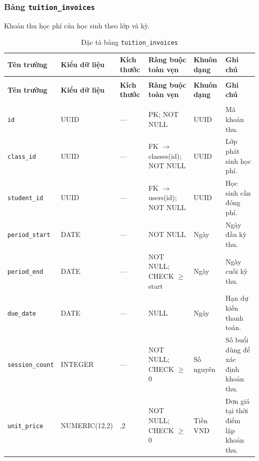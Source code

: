 \subsubsection{Bảng \texttt{tuition\_invoices}}
Khoản thu học phí của học sinh theo lớp và kỳ.

\begingroup
\fontsize{9.2}{11.2}\selectfont
\setlength{\tabcolsep}{2.4pt}
\renewcommand{\arraystretch}{1.22}
\begin{longtable}{|>{\raggedright\arraybackslash}p{2.25cm}|>{\raggedright\arraybackslash}p{2.48cm}|>{\raggedright\arraybackslash}p{0.95cm}|>{\raggedright\arraybackslash}p{3.0cm}|>{\raggedright\arraybackslash}p{1.25cm}|>{\raggedright\arraybackslash}p{4.27cm}|}
\caption{Đặc tả bảng \texttt{tuition\_invoices}}\label{tab:csdl:tuition_invoices}\\
\hline\rowcolor{blue!11}\textbf{Tên trường}&\textbf{Kiểu dữ liệu}&\textbf{Kích thước}&\textbf{Ràng buộc toàn vẹn}&\textbf{Khuôn dạng}&\textbf{Ghi chú}\\\hline
\endfirsthead
\multicolumn{6}{r}{\textit{Tiếp bảng \texttt{tuition\_invoices}}}\\
\hline\rowcolor{blue!11}\textbf{Tên trường}&\textbf{Kiểu dữ liệu}&\textbf{Kích thước}&\textbf{Ràng buộc toàn vẹn}&\textbf{Khuôn dạng}&\textbf{Ghi chú}\\\hline
\endhead
\hline\multicolumn{6}{r}{\footnotesize\textit{Còn tiếp trang sau}}\\
\endfoot
\hline
\endlastfoot
\texttt{id} & UUID & — & PK; NOT NULL & UUID & Mã khoản thu.\\\hline
\rowcolor{gray!5}
\texttt{class\_\allowbreak{}id} & UUID & — & FK $\rightarrow$ classes(id); NOT NULL & UUID & Lớp phát sinh học phí.\\\hline
\texttt{student\_\allowbreak{}id} & UUID & — & FK $\rightarrow$ users(id); NOT NULL & UUID & Học sinh cần đóng phí.\\\hline
\rowcolor{gray!5}
\texttt{period\_\allowbreak{}start} & DATE & — & NOT NULL & Ngày & Ngày đầu kỳ thu.\\\hline
\texttt{period\_\allowbreak{}end} & DATE & — & NOT NULL; CHECK $\geq$ start & Ngày & Ngày cuối kỳ thu.\\\hline
\rowcolor{gray!5}
\texttt{due\_\allowbreak{}date} & DATE & — & NULL & Ngày & Hạn dự kiến thanh toán.\\\hline
\texttt{session\_\allowbreak{}count} & INTEGER & — & NOT NULL; CHECK $\geq$ 0 & Số nguyên & Số buổi dùng để xác định khoản thu.\\\hline
\rowcolor{gray!5}
\texttt{unit\_\allowbreak{}price} & NUMERIC(12,2) & 12,2 & NOT NULL; CHECK $\geq$ 0 & Tiền VND & Đơn giá tại thời điểm lập khoản thu.\\\hline

\end{longtable}
